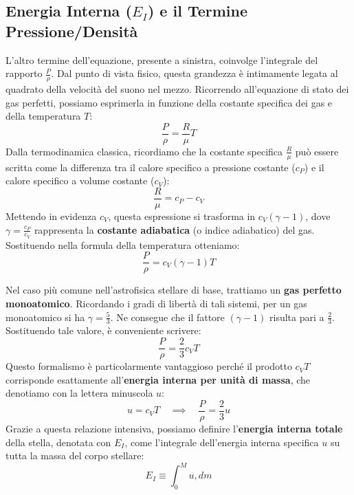 \subsection{Energia Interna ($E_I$) e il Termine Pressione/Densità}
L'altro termine dell'equazione, presente a sinistra, coinvolge l'integrale del rapporto $\frac{P}{\rho}$. Dal punto di vista fisico, questa grandezza è intimamente legata al quadrato della velocità del suono nel mezzo. Ricorrendo all'equazione di stato dei gas perfetti, possiamo esprimerla in funzione della costante specifica dei gas e della temperatura $T$:
\begin{equation}
\frac{P}{\rho} = \frac{R}{\mu} T
\end{equation}
Dalla termodinamica classica, ricordiamo che la costante specifica $\frac{R}{\mu}$ può essere scritta come la differenza tra il calore specifico a pressione costante ($c_P$) e il calore specifico a volume costante ($c_V$):
\begin{equation}
\frac{R}{\mu} = c_P - c_V
\end{equation}
Mettendo in evidenza $c_V$, questa espressione si trasforma in $c_V (\gamma - 1)$, dove $\gamma = \frac{c_P}{c_V}$ rappresenta la \textbf{costante adiabatica} (o indice adiabatico) del gas. Sostituendo nella formula della temperatura otteniamo:
\begin{equation}
\frac{P}{\rho} = c_V (\gamma - 1) T
\end{equation}

Nel caso più comune nell'astrofisica stellare di base, trattiamo un \textbf{gas perfetto monoatomico}. Ricordando i gradi di libertà di tali sistemi, per un gas monoatomico si ha $\gamma = \frac{5}{3}$. Ne consegue che il fattore $(\gamma - 1)$ risulta pari a $\frac{2}{3}$.
Sostituendo tale valore, è conveniente scrivere:
\begin{equation}
\frac{P}{\rho} = \frac{2}{3} c_V T
\end{equation}
Questo formalismo è particolarmente vantaggioso perché il prodotto $c_V T$ corrisponde esattamente all'\textbf{energia interna per unità di massa}, che denotiamo con la lettera minuscola $u$:
\begin{equation}
u = c_V T \quad \implies \quad \frac{P}{\rho} = \frac{2}{3} u
\end{equation}
Grazie a questa relazione intensiva, possiamo definire l'\textbf{energia interna totale} della stella, denotata con $E_I$, come l'integrale dell'energia interna specifica $u$ su tutta la massa del corpo stellare:
\begin{equation}
E_I \equiv \int_{0}^{M} u , dm
\end{equation}

